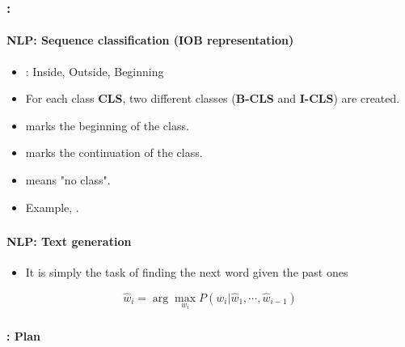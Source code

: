 \documentclass[xcolor=table]{beamer}
\begin{document}
\begin{frame}
	\frametitle{\insertshortsubtitle: \insertsection}
	\framesubtitle{NLP: Sequence classification (IOB representation)}
	
	\begin{itemize}
		\item {}: Inside, Outside, Beginning
		\item For each class \textbf{CLS}, two different classes (\textbf{B-CLS} and \textbf{I-CLS}) are created.
		\item {} marks the beginning of the class.
		\item {} marks the continuation of the class.
		\item {} means "no class".
		\item Example, .
	\end{itemize}
\end{frame}


\begin{frame}
	\frametitle{\inserttitle}
	\framesubtitle{NLP: Text generation}
	
	\begin{itemize}
		\item It is simply the task of finding the next word given the past ones
	\end{itemize}
	
	\[\hat{w}_i = \arg\max\limits_{w_i} P(w_i | \hat{w}_{1}, \cdots, \hat{w}_{i-1})\]
	
\end{frame}


\begin{frame}
	\frametitle{\inserttitle}
	\framesubtitle{\insertshortsubtitle: Plan}
	
	\begin{multicols}{2}
		\small
		\tableofcontents
	\end{multicols}
\end{frame}



\end{document}
